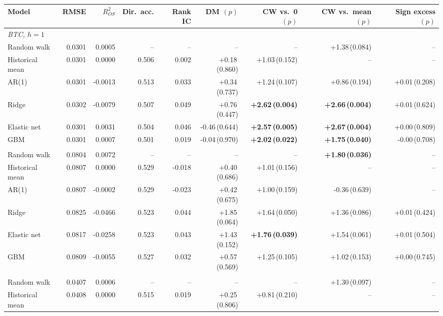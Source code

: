\begin{tabular}{lrrrrrrrr}
\toprule
Model & RMSE & $R^2_{OS}$ & Dir.\ acc. & Rank IC & DM $(p)$ & CW vs.\ 0 $(p)$ & CW vs.\ mean $(p)$ & Sign excess $(p)$ \\
\midrule
\multicolumn{9}{l}{\emph{BTC, $h=1$}} \\
\quad Random walk & 0.0301 & 0.0005 & -- & -- & -- & -- & +1.38\,(0.084) & -- \\
\quad Historical mean & 0.0301 & 0.0000 & 0.506 & 0.002 & +0.18\,(0.860) & +1.03\,(0.152) & -- & -- \\
\quad AR(1) & 0.0301 & -0.0013 & 0.513 & 0.033 & +0.34\,(0.737) & +1.24\,(0.107) & +0.86\,(0.194) & +0.01\,(0.208) \\
\quad Ridge & 0.0302 & -0.0079 & 0.507 & 0.049 & +0.76\,(0.447) & \textbf{+2.62\,(0.004)} & \textbf{+2.66\,(0.004)} & +0.01\,(0.624) \\
\quad Elastic net & 0.0301 & 0.0031 & 0.504 & 0.046 & -0.46\,(0.644) & \textbf{+2.57\,(0.005)} & \textbf{+2.67\,(0.004)} & +0.00\,(0.809) \\
\quad GBM & 0.0301 & 0.0007 & 0.501 & 0.019 & -0.04\,(0.970) & \textbf{+2.02\,(0.022)} & \textbf{+1.75\,(0.040)} & -0.00\,(0.708) \\
\addlinespace
\multicolumn{9}{l}{\emph{BTC, $h=7$}} \\
\quad Random walk & 0.0804 & 0.0072 & -- & -- & -- & -- & \textbf{+1.80\,(0.036)} & -- \\
\quad Historical mean & 0.0807 & 0.0000 & 0.529 & -0.018 & +0.40\,(0.686) & +1.01\,(0.156) & -- & -- \\
\quad AR(1) & 0.0807 & -0.0002 & 0.529 & -0.023 & +0.42\,(0.675) & +1.00\,(0.159) & -0.36\,(0.639) & -- \\
\quad Ridge & 0.0825 & -0.0466 & 0.523 & 0.044 & +1.85\,(0.064) & +1.64\,(0.050) & +1.36\,(0.086) & +0.01\,(0.424) \\
\quad Elastic net & 0.0817 & -0.0258 & 0.523 & 0.043 & +1.43\,(0.152) & \textbf{+1.76\,(0.039)} & +1.54\,(0.061) & +0.01\,(0.504) \\
\quad GBM & 0.0809 & -0.0055 & 0.527 & 0.032 & +0.57\,(0.569) & +1.25\,(0.105) & +1.02\,(0.153) & +0.00\,(0.745) \\
\addlinespace
\multicolumn{9}{l}{\emph{ETH, $h=1$}} \\
\quad Random walk & 0.0407 & 0.0006 & -- & -- & -- & -- & +1.30\,(0.097) & -- \\
\quad Historical mean & 0.0408 & 0.0000 & 0.515 & 0.019 & +0.25\,(0.806) & +0.81\,(0.210) & -- & -- \\

\end{tabular}
